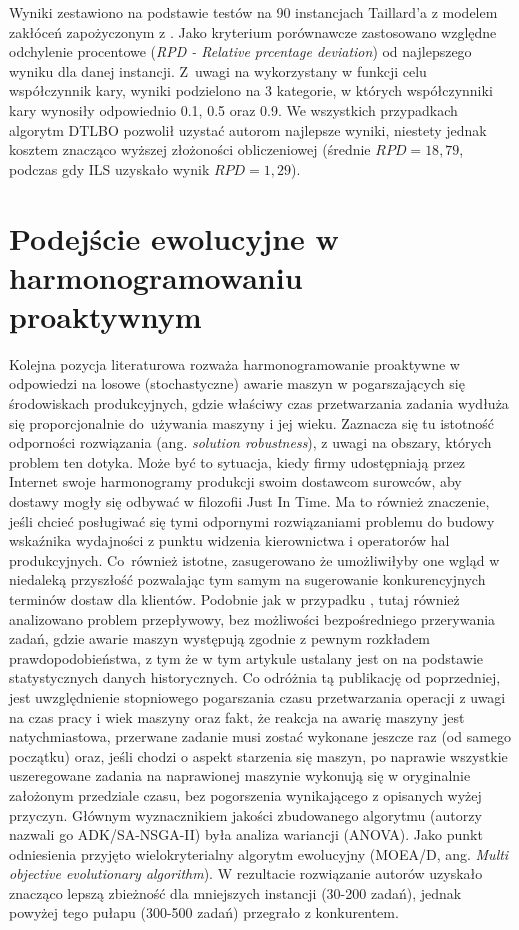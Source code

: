 \documentclass[archivemode]{mgr}
\begin{document}
Wyniki zestawiono na podstawie testów na 90 instancjach Taillard'a z modelem zakłóceń zapożyczonym z \cite{Katragjini2013}. Jako kryterium porównawcze zastosowano względne odchylenie procentowe (\emph{RPD - Relative prcentage deviation}) od najlepszego wyniku dla danej instancji. Z~uwagi na wykorzystany w funkcji celu współczynnik kary, wyniki podzielono na 3 kategorie, w których współczynniki kary wynosiły odpowiednio 0.1, 0.5 oraz 0.9. We wszystkich przypadkach algorytm DTLBO pozwolił uzystać autorom najlepsze wyniki, niestety jednak kosztem znacząco wyższej złożoności obliczeniowej (średnie $RPD = 18,79$, podczas gdy ILS uzyskało wynik $RPD = 1,29$).
%
\section[Podejście ewolucyjne w harmonogramowaniu  proaktywnym]{Podejście ewolucyjne w harmonogramowaniu\\ proaktywnym}
Kolejna pozycja literaturowa \cite{KBEPS} rozważa harmonogramowanie proaktywne w odpowiedzi na losowe (stochastyczne) awarie maszyn w pogarszających się środowiskach produkcyjnych, gdzie właściwy czas przetwarzania zadania wydłuża się proporcjonalnie do~używania maszyny i jej wieku. Zaznacza się tu istotność odporności rozwiązania (ang. \emph{solution robustness}), z uwagi na obszary, których problem ten dotyka. Może być to sytuacja, kiedy firmy udostępniają przez Internet swoje harmonogramy produkcji swoim dostawcom surowców, aby dostawy mogły się odbywać w filozofii Just In Time. Ma to również znaczenie, jeśli chcieć posługiwać się tymi odpornymi rozwiązaniami problemu do budowy wskaźnika wydajności z punktu widzenia kierownictwa i operatorów hal produkcyjnych. \mbox{Co również} istotne, zasugerowano że umożliwiłyby one wgląd w niedaleką przyszłość pozwalając tym samym na sugerowanie konkurencyjnych terminów dostaw dla klientów. Podobnie jak w przypadku \cite{DTLBO}, tutaj również analizowano problem przepływowy, bez możliwości bezpośredniego przerywania zadań, gdzie awarie maszyn występują zgodnie z pewnym rozkładem prawdopodobieństwa, z tym że w tym artykule ustalany jest on na podstawie statystycznych danych historycznych. Co odróżnia tą publikację od poprzedniej, jest uwzględnienie stopniowego pogarszania czasu przetwarzania operacji z uwagi na czas pracy i wiek maszyny oraz fakt, że reakcja na awarię maszyny jest natychmiastowa, przerwane zadanie musi zostać wykonane jeszcze raz (od samego początku) oraz, jeśli chodzi o aspekt starzenia się maszyn, po naprawie wszystkie uszeregowane zadania na naprawionej maszynie wykonują się w oryginalnie założonym przedziale czasu, bez pogorszenia wynikającego z opisanych wyżej przyczyn. Głównym wyznacznikiem jakości zbudowanego algorytmu (autorzy nazwali go ADK/SA-NSGA-II) była analiza wariancji (ANOVA). Jako punkt odniesienia przyjęto wielokryterialny algorytm ewolucyjny (MOEA/D, ang. \emph{Multi objective evolutionary algorithm}). W rezultacie rozwiązanie autorów uzyskało znacząco lepszą zbieżność dla mniejszych instancji (30-200 zadań), jednak powyżej tego pułapu (300-500 zadań) przegrało z konkurentem.  
%
\end{document}
